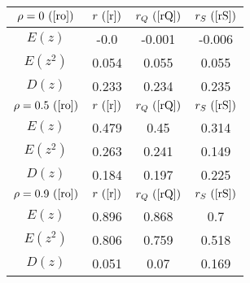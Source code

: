 \begin{tabular}{|c|c|c|c|}
\hline
$\rho = 0~(\ref{ro})$ & $r ~(\ref{r})$ & $r_Q ~(\ref{rQ})$ & $r_S ~(\ref{rS})$\\
\hline
$E(z)$ & -0.0 & -0.001 & -0.006\\
\hline
$E(z^2)$ & 0.054 & 0.055 & 0.055\\
\hline
$D(z)$ & 0.233 & 0.234 & 0.235\\
\hline
$\rho = 0.5~(\ref{ro})$ & $r ~(\ref{r})$ & $r_Q ~(\ref{rQ})$ & $r_S ~(\ref{rS})$\\
\hline
$E(z)$ & 0.479 & 0.45 & 0.314\\
\hline
$E(z^2)$ & 0.263 & 0.241 & 0.149\\
\hline
$D(z)$ & 0.184 & 0.197 & 0.225\\
\hline
$\rho = 0.9~(\ref{ro})$ & $r ~(\ref{r})$ & $r_Q ~(\ref{rQ})$ & $r_S ~(\ref{rS})$\\
\hline
$E(z)$ & 0.896 & 0.868 & 0.7\\
\hline
$E(z^2)$ & 0.806 & 0.759 & 0.518\\
\hline
$D(z)$ & 0.051 & 0.07 & 0.169\\
\hline
\end{tabular}